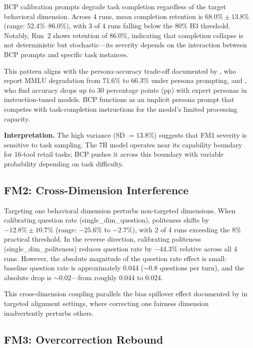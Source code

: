 \documentclass[11pt,a4paper]{article}
\begin{document}
BCP calibration prompts degrade task completion regardless of the target behavioral dimension. Across 4 runs, mean completion retention is $68.0\% \pm 13.8\%$ (range: 52.4\%--86.0\%), with 3 of 4 runs falling below the 80\% H3 threshold. Notably, Run~2 shows retention of 86.0\%, indicating that completion collapse is not deterministic but stochastic---its severity depends on the interaction between BCP prompts and specific task instances.

This pattern aligns with the persona-accuracy trade-off documented by \citet{basil2025playing_pretend}, who report MMLU degradation from 71.6\% to 66.3\% under persona prompting, and \citet{hu2026expert_persona}, who find accuracy drops up to 30 percentage points (pp) with expert personas in instruction-tuned models. BCP functions as an implicit persona prompt that competes with task-completion instructions for the model's limited processing capacity.

\textbf{Interpretation.} The high variance (SD $= 13.8\%$) suggests that FM1 severity is sensitive to task sampling. The 7B model operates near its capability boundary for 16-tool retail tasks; BCP pushes it across this boundary with variable probability depending on task difficulty.

\subsection{FM2: Cross-Dimension Interference}

Targeting one behavioral dimension perturbs non-targeted dimensions. When calibrating question rate (single\_dim\_question), politeness shifts by $-12.8\% \pm 10.7\%$ (range: $-25.6\%$ to $-2.7\%$), with 2 of 4 runs exceeding the 8\% practical threshold. In the reverse direction, calibrating politeness (single\_dim\_politeness) reduces question rate by $-44.3\%$ relative across all 4 runs. However, the absolute magnitude of the question rate effect is small: baseline question rate is approximately 0.044 (${\sim}0.8$ questions per turn), and the absolute drop is ${\sim}0.02$---from roughly 0.044 to 0.024.

This cross-dimension coupling parallels the bias spillover effect documented by \citet{gupta2026intra_fairness} in targeted alignment settings, where correcting one fairness dimension inadvertently perturbs others.

\subsection{FM3: Overcorrection Rebound}
\end{document}
